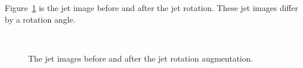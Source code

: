 \documentclass[12pt]{article}
\begin{document}
        Figure~\ref{fig:jet_rotation_jet_constituent_jet_image} is the jet image before and after the jet rotation. These jet images differ by a rotation angle.
        \begin{figure}[htpb]
            \centering
             \\
            \caption{The jet images before and after the jet rotation augmentation.}
            \label{fig:jet_rotation_jet_constituent_jet_image}
        \end{figure}
\end{document}
